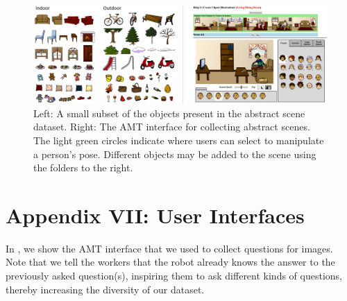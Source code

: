 \begin{figure}[h]
\centering
\includegraphics[width=1\linewidth]{figures/clipart_details.pdf}
\caption{Left: A small subset of the objects present in the abstract scene dataset. Right: The AMT interface for collecting abstract scenes.
The light green circles indicate where users can select to manipulate a person's pose. Different objects may be added to the scene using the folders to the right.}
\label{fig:clipart_details}
\vspace{10pt}
\end{figure}


\section*{Appendix VII: User Interfaces}
\label{sec:uis}
In , we show the AMT interface that we used to collect questions for images. Note that we tell the workers that the robot already knows the answer to the previously asked question(s), inspiring them to ask different kinds of questions, thereby increasing the diversity of our dataset.

